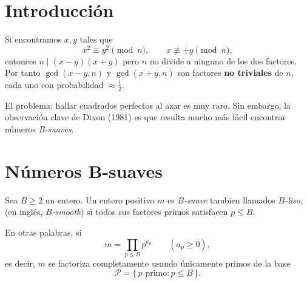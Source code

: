 
\section{Introducción}

Si encontramos $x, y$ tales que
\begin{equation}\label{eq:cong}
x^2 \equiv y^2 \pmod{n},
\qquad x \not\equiv \pm y \pmod{n},
\end{equation}
entonces $n \mid (x-y)(x+y)$ pero $n$ no divide a ninguno de los dos factores.
Por tanto $\gcd(x-y, n)$ y $\gcd(x+y, n)$ son factores \textbf{no triviales} de $n$,
cada uno con probabilidad $\approx \tfrac{1}{2}$.

El problema: hallar cuadrados perfectos al azar es muy raro. Sin embargo, la observación
clave de Dixon (1981) es que resulta mucho más fácil encontrar números
\emph{B-suaves}.

\section{Números B-suaves}

\begin{definicion}

Sea $B \ge 2$ un entero. Un entero positivo $m$ es \emph{$B$-suave} tambien llamados 
\emph{$B$-liso}, (en inglés, \emph{$B$-smooth}) si todos sus factores primos satisfacen
$p \le B$. 

En otras palabras, si
\begin{equation}
m = \prod_{p \le B} p^{a_p}
\qquad (a_p \ge 0),
\end{equation}
es decir, $m$ se factoriza completamente usando únicamente primos de la base
\begin{equation}
\mathcal{P} = \{\, p \text{ primo} : p \le B \,\}.
\end{equation}
\end{definicion}

